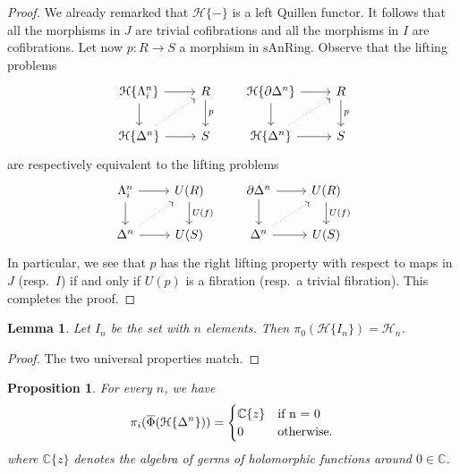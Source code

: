 \documentclass[12pt,a4paper,reqno]{amsart}
\theoremstyle{plain}
\newtheorem{lem}[thm]{Lemma}
\newtheorem{prop}[thm]{Proposition}
\theoremstyle{definition}
\theoremstyle{remark}
\numberwithin{equation}{section}
\begin{document}
\begin{proof}
	We already remarked that ${\mathcal H}\{-\}$ is a left Quillen functor.
	It follows that all the morphisms in $J$ are trivial cofibrations and all the morphisms in $I$ are cofibrations.
	Let now $p \colon R \to S$ a morphism in $\mathrm{sAnRing}$.
	Observe that the lifting problems
	\[ \begin{tikzcd}
		{{\mathcal H}\{\Lambda^n_i\}} \arrow{r} \arrow{d} & R \arrow{d}{p} \\
		{{\mathcal H}\{\Delta^n\}} \arrow{r} \arrow[dotted]{ur} & S
	\end{tikzcd} \qquad \begin{tikzcd}
		{\mathcal H}\{\partial \Delta^n\} \arrow{r} \arrow{d} & R \arrow{d}{p} \\
		{\mathcal H}\{\Delta^n\} \arrow{r} \arrow[dotted]{ur} & S
	\end{tikzcd} \]
	are respectively equivalent to the lifting problems
	\[ \begin{tikzcd}
		\Lambda^n_i \arrow{d} \arrow{r} & U(R) \arrow{d}{U(f)} \\
		\Delta^n \arrow{r} \arrow[dotted]{ur} & U(S)
	\end{tikzcd} \qquad \begin{tikzcd}
		\partial \Delta^n \arrow{r} \arrow{d} & U(R) \arrow{d}{U(f)} \\
		\Delta^n \arrow{r} \arrow[dotted]{ur} & U(S)
	\end{tikzcd} \]
	In particular, we see that $p$ has the right lifting property with respect to maps in $J$ (resp.\ $I$) if and only if $U(p)$ is a fibration (resp.\ a trivial fibration).
	This completes the proof.
\end{proof}

\begin{lem}
	Let $I_n$ be the set with $n$ elements.
	Then $\pi_0({\mathcal H}\{I_n\}) = {\mathcal H}_n$.
\end{lem}

\begin{proof}
	The two universal properties match.
\end{proof}

\begin{prop} \label{prop:pi_*_of_the_point}
	For every $n$, we have
	\[ \pi_i( \overline{\Phi}({\mathcal H}\{\Delta^n\}) ) = \begin{cases} \mathbb C\{z\} & \text{if } $n = 0$ \\ 0 & \text{otherwise.} \end{cases} \]
	where $\mathbb C\{z\}$ denotes the algebra of germs of holomorphic functions around $0 \in \mathbb C$.
\end{prop}
\end{document}
